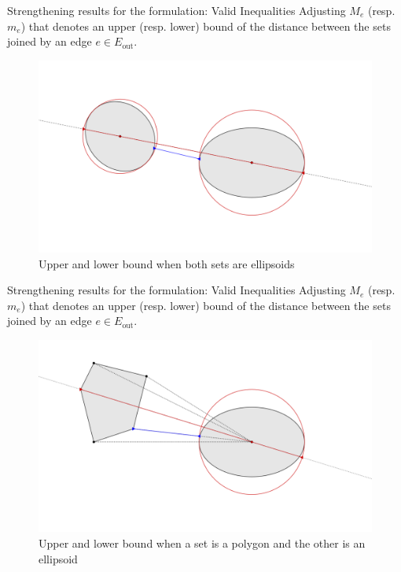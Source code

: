 \documentclass[slidestop,usepdftitle=false,10pt]{beamer}
\begin{document}
    \begin{frame}{Strengthening results for the formulation: Valid Inequalities}
        Adjusting $M_e$ (resp. $m_e$) that denotes an upper (resp. lower) bound of the distance between the sets joined by an edge $e \in E_{\text{out}}$.
        
        \begin{figure}
            \centering
            \includegraphics[width=0.7\linewidth]{bounds_ellip_ellip.png}
            \caption{Upper and lower bound when both sets are ellipsoids}
            \label{fig:boundsellipellip}
        \end{figure}
        
	\end{frame}
	
	\begin{frame}{Strengthening results for the formulation: Valid Inequalities}
        Adjusting $M_e$ (resp. $m_e$) that denotes an upper (resp. lower) bound of the distance between the sets joined by an edge $e \in E_{\text{out}}$.
        
        \begin{figure}
            \centering
            \includegraphics[width=0.7\linewidth]{bounds_ellip_polgon}
            \caption{Upper and lower bound when a set is a polygon and the other is an ellipsoid}
            \label{fig:boundsellipellip}
        \end{figure}
        
	\end{frame}
	
\end{document}
